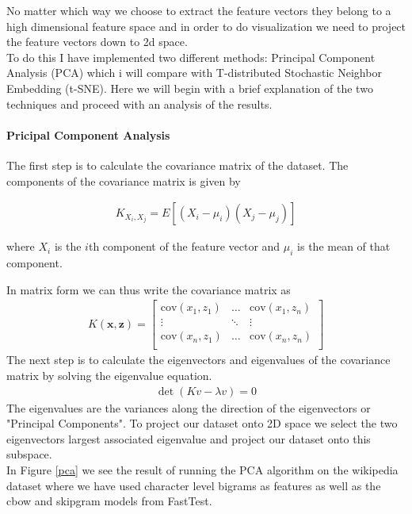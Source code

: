 No matter which way we choose to extract the feature vectors they belong to a high dimensional feature space and in order to do visualization we need to project the feature vectors down to 2d space.\\

To do this I have implemented two different methods: Principal Component Analysis (PCA) which i will compare with T-distributed Stochastic Neighbor Embedding (t-SNE).
Here we will begin with a brief explanation of the two techniques and proceed with an analysis of the results.

\paragraph{Pricipal Component Analysis}

The first step is to calculate the covariance matrix of the dataset.
The components of the covariance matrix is given by

\begin{align}
K_{X_i,X_j} = E[(X_i - \mu_i )(X_j -  \mu_j)]
\end{align}

where $X_{i}$ is the $i$th component of the feature vector and $\mu_{i}$ is the mean of that component.

In matrix form we can thus write the covariance matrix as
\begin{align}
K(\mathbf{x},\mathbf{z}) =
\begin{bmatrix}
    \text{cov}(x_1,z_1) &  \dots  & \text{cov}(x_1,z_n) \\
    \vdots & \ddots     & \vdots \\
    \text{cov}(x_n,z_1) & \dots  & \text{cov}(x_n,z_n) \\
\end{bmatrix}
\end{align}
The next step is to calculate the eigenvectors and eigenvalues of the covariance matrix by solving the eigenvalue equation.
\begin{align}
\det (K v-\lambda v) = 0
\end{align}
The eigenvalues are the variances along the direction of the eigenvectors or "Principal Components". To project our dataset onto 2D space we select the two eigenvectors largest associated eigenvalue and project our dataset onto this subspace.\\

In Figure \ref{pca} we see the result of running the PCA algorithm on the wikipedia dataset where we have used character level bigrams as features as well as the cbow and skipgram models from FastTest.\\


